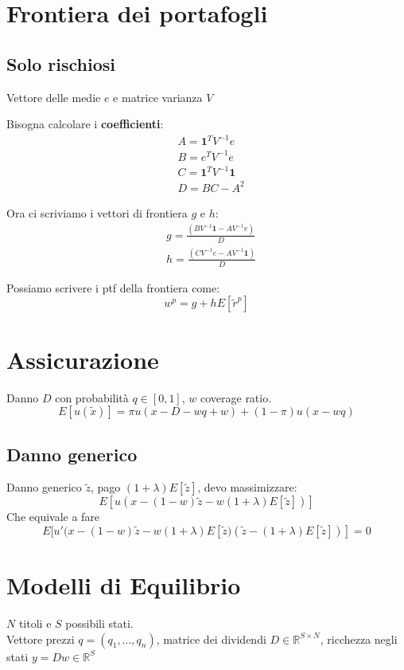 \documentclass[a4paper,notitlepage]{report}%
\newcommand{\R}{\mathbb{R}}%
\begin{document}
\begin{multicols*}{2}
\section*{Frontiera dei portafogli}

    \subsection*{Solo rischiosi}
        Vettore delle medie $e$ e matrice varianza $V$

        Bisogna calcolare i \textbf{coefficienti}:
        \begin{align*}
            & A = \mathbf{1}^T V^{-1} e \\
            & B = e^T V^{-1} e \\
            & C = \mathbf{1}^T V^{-1} \mathbf{1} \\
            & D = BC-A^2
        \end{align*}

        Ora ci scriviamo i vettori di frontiera $g$ e $h$:
        \begin{align*}
            & g = \frac{(BV^{-1}\mathbf{1} - AV^{-1}e)}{D} \\
            & h = \frac{(CV^{-1}e - AV^{-1}\mathbf{1})}{D}
        \end{align*}

        Possiamo scrivere i ptf della frontiera come:
        \[
            w^p = g+hE[\tilde{r}^p]   
        \]


\section*{Assicurazione}

    Danno $D$ con probabilità $q\in[0,1]$, $w$ coverage ratio.
    \[
        E[u(\tilde{x})] = \pi u(x-D-wq+w) + (1-\pi) u(x-wq)   
    \]

    \subsection*{Danno generico}
    Danno generico $\tilde{z}$, pago $(1+\lambda)E[\tilde{z}]$, devo massimizzare:
    \[
        E[u( x - (1-w)\tilde{z} - w(1+\lambda)E[\tilde{z}] )]   
    \]
    Che equivale a fare
    \[
        E[ u'(x - (1-w)\tilde{z} - w(1+\lambda)E[\tilde{z} ) ( \tilde{z}-(1+\lambda) E[\tilde{z}] ) ] = 0
    \]


\section*{Modelli di Equilibrio}
    $N$ titoli e $S$ possibili stati. \\
    Vettore prezzi $q=(q_1,\dots,q_n)$,
    matrice dei dividendi $D\in\R^{S\times N}$,
    ricchezza negli stati $y=Dw\in\R^S$


\end{multicols*}
\end{document}
